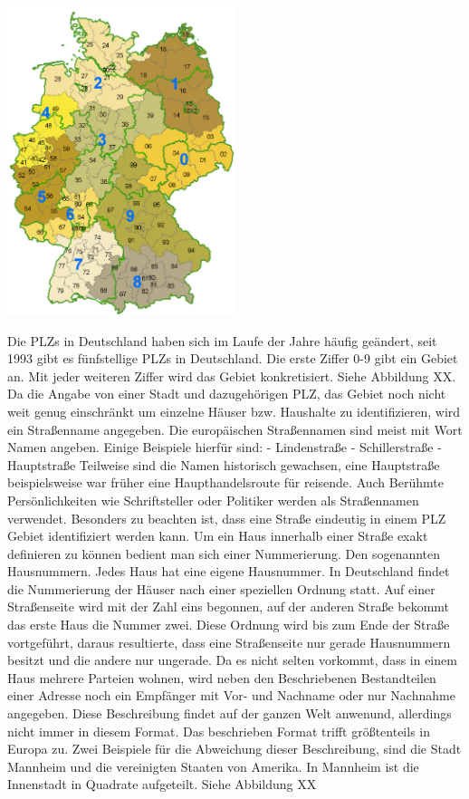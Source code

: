 \includegraphics[width=0.50\textwidth]{ref/images/plzgebiete.png}

 Die PLZs in Deutschland haben sich im Laufe der Jahre häufig geändert, seit 1993 gibt es fünfstellige PLZs in Deutschland. Die erste Ziffer 0-9 gibt ein Gebiet an. Mit jeder weiteren Ziffer wird das Gebiet konkretisiert. Siehe Abbildung XX. Da die Angabe von einer Stadt und dazugehörigen PLZ, das Gebiet noch nicht weit genug einschränkt um einzelne Häuser bzw. Haushalte zu identifizieren, wird ein Straßenname angegeben.
Die europäischen Straßennamen sind meist mit Wort Namen angeben.
Einige Beispiele hierfür sind:
-	Lindenstraße
-	Schillerstraße
-	Hauptstraße
Teilweise sind die Namen historisch gewachsen, eine Hauptstraße beispielsweise war früher eine Haupthandelsroute für reisende. Auch Berühmte Persönlichkeiten wie Schriftsteller oder Politiker werden als Straßennamen verwendet. Besonders zu beachten ist, dass eine Straße eindeutig in einem PLZ Gebiet identifiziert werden kann.
Um ein Haus innerhalb einer Straße exakt definieren zu können bedient man sich einer Nummerierung. Den sogenannten Hausnummern. Jedes Haus hat eine eigene Hausnummer. 
In Deutschland findet die Nummerierung der Häuser nach einer speziellen Ordnung statt. Auf einer Straßenseite wird mit der Zahl eins begonnen, auf der anderen Straße bekommt das erste Haus die Nummer zwei. Diese Ordnung wird bis zum Ende der Straße vortgeführt, daraus resultierte, dass eine Straßenseite nur gerade Hausnummern besitzt und die andere nur ungerade.
Da es nicht selten vorkommt, dass in einem Haus mehrere Parteien wohnen, wird neben den Beschriebenen Bestandteilen einer Adresse noch ein Empfänger mit Vor- und Nachname oder nur Nachnahme angegeben.
Diese Beschreibung findet auf der ganzen Welt anwenund, allerdings nicht immer in diesem Format. Das beschrieben Format trifft größtenteils in Europa zu. Zwei Beispiele für die Abweichung dieser Beschreibung, sind die Stadt Mannheim und die vereinigten Staaten von Amerika.
In Mannheim ist die Innenstadt in Quadrate aufgeteilt. Siehe Abbildung XX 

